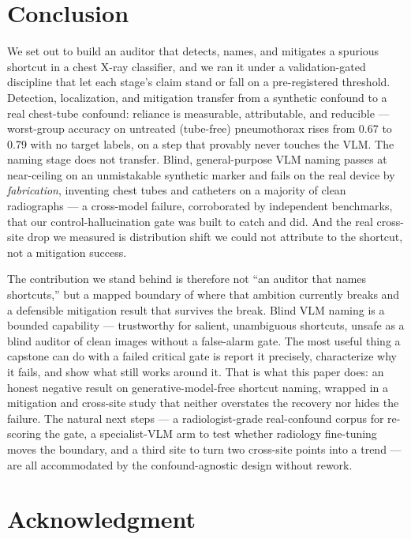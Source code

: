 \documentclass{ieeeaccess}
\begin{document}
\section{Conclusion}
We set out to build an auditor that detects, names, and mitigates a spurious shortcut in a chest X-ray classifier, and we ran it under a validation-gated discipline that let each stage's claim stand or fall on a pre-registered threshold. Detection, localization, and mitigation transfer from a synthetic confound to a real chest-tube confound: reliance is measurable, attributable, and reducible --- worst-group accuracy on untreated (tube-free) pneumothorax rises from 0.67 to 0.79 with no target labels, on a step that provably never touches the VLM. The naming stage does not transfer. Blind, general-purpose VLM naming passes at near-ceiling on an unmistakable synthetic marker and fails on the real device by \emph{fabrication}, inventing chest tubes and catheters on a majority of clean radiographs --- a cross-model failure, corroborated by independent benchmarks, that our control-hallucination gate was built to catch and did. And the real cross-site drop we measured is distribution shift we could not attribute to the shortcut, not a mitigation success.

The contribution we stand behind is therefore not ``an auditor that names shortcuts,'' but a mapped boundary of where that ambition currently breaks and a defensible mitigation result that survives the break. Blind VLM naming is a bounded capability --- trustworthy for salient, unambiguous shortcuts, unsafe as a blind auditor of clean images without a false-alarm gate. The most useful thing a capstone can do with a failed critical gate is report it precisely, characterize why it fails, and show what still works around it. That is what this paper does: an honest negative result on generative-model-free shortcut naming, wrapped in a mitigation and cross-site study that neither overstates the recovery nor hides the failure. The natural next steps --- a radiologist-grade real-confound corpus for re-scoring the gate, a specialist-VLM arm to test whether radiology fine-tuning moves the boundary, and a third site to turn two cross-site points into a trend --- are all accommodated by the confound-agnostic design without rework.

\section*{Acknowledgment}
\end{document}
